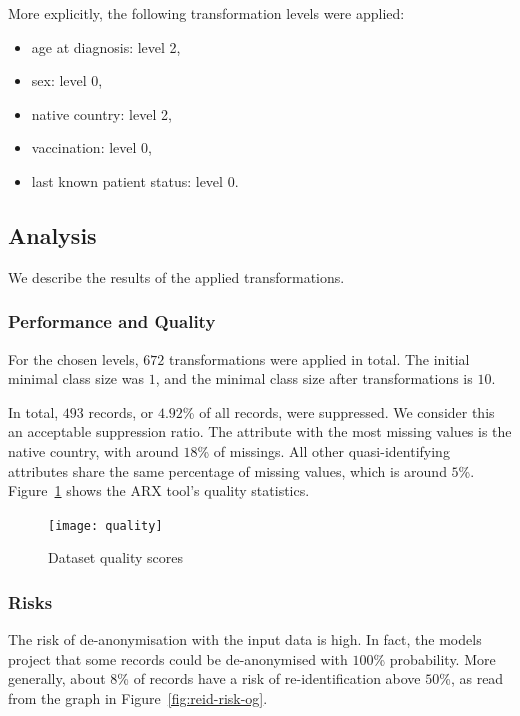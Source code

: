 \documentclass[parskip=half]{scrartcl}
\newcommand\figref{Figure~\ref}
\begin{document}
More explicitly, the following transformation levels were applied:
\begin{itemize}
    \item age at diagnosis: level 2,
    \item sex: level 0,
    \item native country: level 2,
    \item vaccination: level 0,
    \item last known patient status: level 0.
\end{itemize}

\subsection{Analysis}

We describe the results of the applied transformations.

\subsubsection{Performance and Quality}

For the chosen levels, $672$ transformations were applied in total. The initial
minimal class size was $1$, and the minimal class size after transformations is
$10$.

In total, $493$ records, or $4.92$\% of all records, were suppressed. We
consider this an acceptable suppression ratio. The attribute with the most
missing values is the native country, with around $18$\% of missings. All
other quasi-identifying attributes share the same percentage of missing values,
which is around $5$\%. \figref{fig:quality} shows the ARX tool's quality
statistics.

\begin{figure}[ht]
    \begin{center}
        \texttt{[image: quality]}
        \caption{Dataset quality scores}
        \label{fig:quality}
    \end{center}
\end{figure}

\subsubsection{Risks}

The risk of de-anonymisation with the input data is high. In fact, the models
project that some records could be de-anonymised with $100$\% probability.
More generally, about $8$\% of records have a risk of re-identification above
$50$\%, as read from the graph in \figref{fig:reid-risk-og}.
\end{document}
